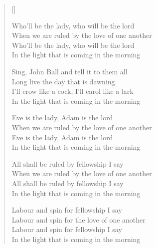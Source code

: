 \pagebreak
\settowidth{\versewidth}{When we are ruled by the love of one another}
\begin{verse}[\versewidth]
\begin{altverse}
Who'll be the lady, who will be the lord\\
When we are ruled by the love of one another\\
Who'll be the lady, who will be the lord\\
In the light that is coming in the morning
\end{altverse}

\begin{chorus}
Sing, John Ball and tell it to them all\\
Long live the day that is dawning\\
I'll crow like a cock, I'll carol like a lark\\
In the light that is coming in the morning
\end{chorus}

\begin{altverse}
Eve is the lady, Adam is the lord\\
When we are ruled by the love of one another\\
Eve is the lady, Adam is the lord\\
In the light that is coming in the morning
\end{altverse}

\begin{altverse}
All shall be ruled by fellowship I say\\
When we are ruled by the love of one another\\
All shall be ruled by fellowship I say\\
In the light that is coming in the morning
\end{altverse}

\begin{altverse}
Labour and spin for fellowship I say\\
Labour and spin for the love of one another\\
Labour and spin for fellowship I say\\
In the light that is coming in the morning
\end{altverse}

\end{verse}
